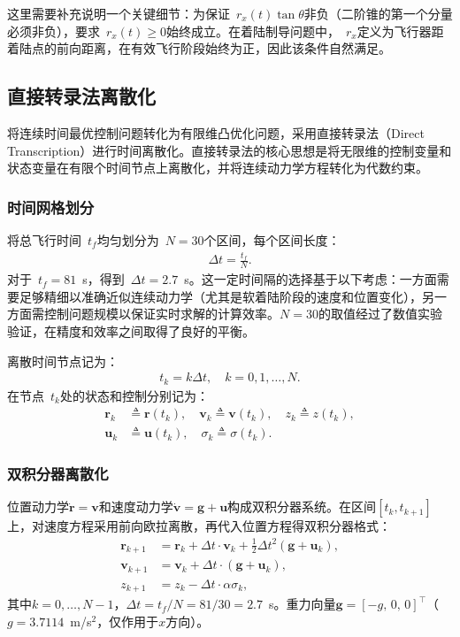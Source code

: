这里需要补充说明一个关键细节：为保证~$r_x(t)\tan\theta$非负（二阶锥的第一个分量必须非负），要求~$r_x(t)\ge 0$始终成立。在着陆制导问题中，~$r_x$定义为飞行器距着陆点的前向距离，在有效飞行阶段始终为正，因此该条件自然满足。

\subsection{直接转录法离散化}\label{sec:discretization}

将连续时间最优控制问题转化为有限维凸优化问题，采用直接转录法（Direct Transcription）进行时间离散化。直接转录法的核心思想是将无限维的控制变量和状态变量在有限个时间节点上离散化，并将连续动力学方程转化为代数约束。

\subsubsection{时间网格划分}

将总飞行时间~$t_f$均匀划分为~$N=30$个区间，每个区间长度：
\begin{align}
\Delta t = \frac{t_f}{N}.
\end{align}
对于~$t_f=81$~s，得到~$\Delta t=2.7$~s。这一定时间隔的选择基于以下考虑：一方面需要足够精细以准确近似连续动力学（尤其是软着陆阶段的速度和位置变化），另一方面需控制问题规模以保证实时求解的计算效率。$N=30$的取值经过了数值实验验证，在精度和效率之间取得了良好的平衡。

离散时间节点记为：
\begin{align}
t_k = k\Delta t,\quad k=0,1,\dots,N.
\end{align}
在节点~$t_k$处的状态和控制分别记为：
\begin{align}
\bm r_k &\triangleq \bm r(t_k),\quad \bm v_k \triangleq \bm v(t_k),\quad z_k \triangleq z(t_k),\\
\bm u_k &\triangleq \bm u(t_k),\quad \sigma_k \triangleq \sigma(t_k).
\end{align}

\subsubsection{双积分器离散化}

位置动力学$\dot{\bm r}=\bm v$和速度动力学$\dot{\bm v}=\bm g+\bm u$构成双积分器系统。在区间$[t_k, t_{k+1}]$上，对速度方程采用前向欧拉离散，再代入位置方程得双积分器格式：
\begin{align}
\bm r_{k+1} &= \bm r_k + \Delta t\cdot \bm v_k + \tfrac{1}{2}\Delta t^2(\bm g + \bm u_k), \label{eq:disc_r} \\
\bm v_{k+1} &= \bm v_k + \Delta t\cdot(\bm g + \bm u_k), \label{eq:disc_v} \\
z_{k+1} &= z_k - \Delta t\cdot\alpha\sigma_k, \label{eq:disc_z}
\end{align}
其中$k=0,\dots,N-1$，$\Delta t = t_f/N = 81/30 = 2.7$~s。重力向量$\bm g=[-g,\,0,\,0]^{\top}$（$g=3.7114$~m/s$^2$，仅作用于$x$方向）。

